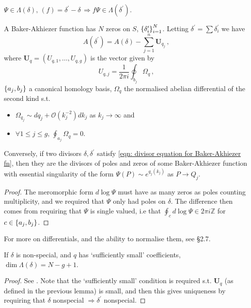\documentclass{article}
\begin{document}
\begin{prop}
	$\Psi \in \Lambda(\delta), \, (f)=\delta^\prime-\delta \, \Rightarrow f\Psi \in \Lambda(\delta^\prime)$.  
\end{prop}

\begin{lemma}\label{lemma: zeros of the Baker-Ahkiezer fn}
	A Baker-Akhiezer function has $N$ zeros on $S$, $\left\{ \delta_i^\prime \right\}_{i=1}^N$. Letting $\delta^\prime = \sum \delta_i^\prime$ we have 
	\begin{equation}\label{eqn: divisor equation for Baker-Akhiezer fn}
	A(\delta^\prime) = A(\delta) - \sum_{j=1}^n \bm{U}_{q_j} \, ,
	\end{equation}
	where $\bm{U}_q = (U_{q,1}, \dots, U_{q,g})$ is the vector given by 
	\[
	U_{q,j} = \frac{1}{2\pi i} \oint_{b_j} \Omega_q\, ,
	\] 
	$\left\{ a_j,b_j \right\}$ a canonical homology basis, $\Omega_q$ the normalised abelian differential of the second kind s.t. 
	\begin{itemize}
		\item $\Omega_{q_j} \sim dq_j + \mathcal{O}(k_j^{-2})dk_j$ as $k_j \to \infty$ and 
		\item $\forall 1 \leq j \leq g, \, \oint_{a_j} \Omega_q =0$. 
	\end{itemize}
	Conversely, if two divisors $\delta, \delta^\prime$ satisfy \ref{eqn: divisor equation for Baker-Akhiezer fn}, then they are the divisors of poles and zeros of some Baker-Akhiezer function with essential singularity of the form $\Psi(P) \sim e^{q_j(k_j)}$ as $P \to Q_j$.
\end{lemma}
\begin{proof}
	The meromorphic form $d\log \Psi$ must have as many zeros as poles counting multiplicity, and we required that $\Psi$ only had poles on $\delta$. The difference then comes from requiring that $\Psi$ is single valued, i.e that $\oint_c d\log\Psi \in 2\pi i \mathbb{Z}$ for $c \in \left\{ a_j, b_j \right\}$. 
\end{proof}

\begin{remark}
	For more on differentials, and the ability to normalise them, see \cite{Dubrovin2009} \S 2.7. 
\end{remark}

\begin{theorem}
	If $\delta$ is non-special, and $q$ has `sufficiently small' coefficients, $\dim \Lambda(\delta)=N-g+1$. 
\end{theorem}
\begin{proof}
	See \cite{Dubrovin2009}. Note that the `sufficiently small' condition is required s.t. $\bm{U}_q$ (as defined in the previous lemma) is small, and then this gives uniqueness by requiring that $\delta$ nonspecial $\Rightarrow \delta^\prime$ nonspecial. 
\end{proof}
\end{document}
